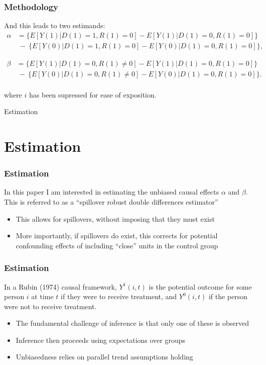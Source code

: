 \documentclass[10pt,letterpaper,subeqn]{beamer}
\begin{document}
\begin{frame}[label=method4]
  \frametitle{Methodology}
And this leads to two estimands:
\begin{eqnarray}
\nonumber
\label{Seqn:DDa}
\alpha&=\{E[Y(1)|D(1)=1,R(1)=0]-E[Y(1)|D(1)=0,R(1)=0]\} \\ \nonumber
      &\ -\ \{E[Y(0)|D(1)=1,R(1)=0]-E[Y(0)|D(1)=0,R(1)=0]\}, 
\end{eqnarray}

\begin{eqnarray}
\nonumber
\beta&=\{E[Y(1)|D(1)=0,R(1)\neq 0]-E[Y(1)|D(1)=0,R(1)=0]\} \\ \nonumber
      &\ -\ \{E[Y(0)|D(1)=0,R(1)\neq 0]-E[Y(0)|D(1)=0,R(1)=0]\}. 
\end{eqnarray}
\vspace{3mm} \\
where $i$ has been supressed for ease of exposition.
\end{frame}

\begin{frame}
\begin{center}
\Large Estimation
\end{center}
\end{frame}


\section{Estimation}
\begin{frame}[label=estim1]
  \frametitle{Estimation}
In this paper I am interested in estimating the unbiased causal effects $\alpha$ 
and $\beta$.  This is referred to as a ``spillover robust double differences
estimator''
\vspace{4mm}
\begin{itemize}
\item This allows for spillovers, without imposing that they must exist
\item More importantly, if spillovers do exist, this corrects for potential 
confounding effects of including ``close'' units in the control group
\end{itemize}
\end{frame}

\begin{frame}[label=estim2]
  \frametitle{Estimation}
In a Rubin (1974) causal framework, $Y^1(i,t)$ is the potential outcome for some 
person $i$ at time $t$ if they were to receive treatment, and $Y^0(i,t)$ if the 
person were not to receive treatment.
\vspace{4mm}
\begin{itemize}
\item The fundamental challenge of inference is that only one of these is observed
\item Inference then proceeds using expectations over groups
\item Unbiasedness relies on parallel trend assumptions holding
\end{itemize}
\end{frame}
\end{document}
